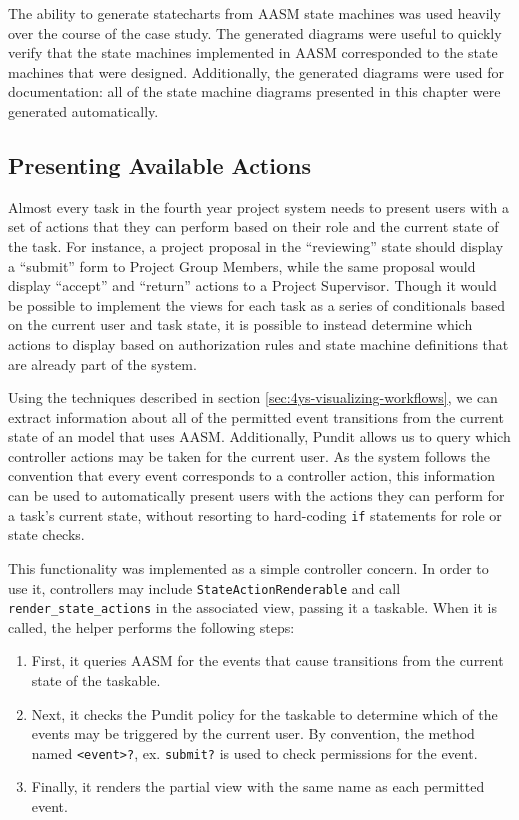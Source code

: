 \documentclass[document.tex]{subfiles}
\begin{document}
The ability to generate statecharts from AASM state machines was used heavily over the course of the case study. The generated diagrams were useful to quickly verify that the state machines implemented in AASM corresponded to the state machines that were designed. Additionally, the generated diagrams were used for documentation: all of the state machine diagrams presented in this chapter were generated automatically.


\FloatBarrier

\subsection {Presenting Available Actions}
\label {sec:4ys-available-actions}

Almost every task in the fourth year project system needs to present users with a set of actions that they can perform based on their role and the current state of the task. For instance, a project proposal in the ``reviewing'' state should display a ``submit'' form to Project Group Members, while the same proposal would display ``accept'' and ``return'' actions to a Project Supervisor. Though it would be possible to implement the views for each task as a series of conditionals based on the current user and task state, it is possible to instead determine which actions to display based on authorization rules and state machine definitions that are already part of the system.

Using the techniques described in section \ref{sec:4ys-visualizing-workflows},
we can extract information about all of the permitted event transitions from the current state of an model that uses AASM. Additionally, Pundit allows us to query which controller actions may be taken for the current user. As the system follows the convention that every event corresponds to a controller action, this information can be used to automatically present users with the actions they can perform for a task's current state, without resorting to hard-coding \verb!if! statements for role or state checks.

This functionality was implemented as a simple controller concern. In order to use it, controllers may include \verb!StateActionRenderable! and call 
\verb!render_state_actions! in the associated view, passing it a taskable. When it is called, the helper performs the following steps:
\begin{enumerate}
\item First, it queries AASM for the events that cause transitions from the current state of the taskable.
\item Next, it checks the Pundit policy for the taskable to determine which of the events may be triggered by the current user. By convention, the method named \verb!<event>?!, ex. \verb!submit?! is used to check permissions for the event.
\item Finally, it renders the partial view with the same name as each permitted event.
\end{enumerate}
\end{document}

